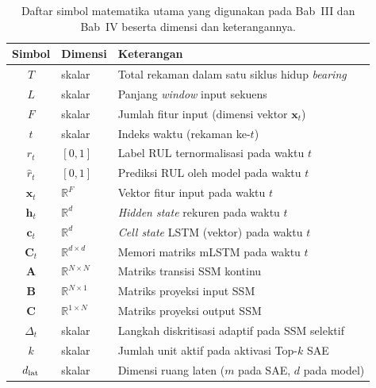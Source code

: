 \begin{table}[ht]
  \centering
  \caption{Daftar simbol matematika utama yang digunakan pada Bab~III
           dan Bab~IV beserta dimensi dan keterangannya.}
  \label{tab:bab3_notasi}
  \small
  \begin{tabular}{@{}cll@{}}
    \toprule
    \textbf{Simbol} & \textbf{Dimensi} & \textbf{Keterangan} \\
    \midrule
    $T$              & skalar          & Total rekaman dalam satu siklus hidup \emph{bearing} \\
    $L$              & skalar          & Panjang \emph{window} input sekuens \\
    $F$              & skalar          & Jumlah fitur input (dimensi vektor $\mathbf{x}_t$) \\
    $t$              & skalar          & Indeks waktu (rekaman ke-$t$) \\
    $r_t$            & $[0,1]$         & Label RUL ternormalisasi pada waktu $t$ \\
    $\hat{r}_t$      & $[0,1]$         & Prediksi RUL oleh model pada waktu $t$ \\
    $\mathbf{x}_t$   & $\mathbb{R}^F$  & Vektor fitur input pada waktu $t$ \\
    $\mathbf{h}_t$   & $\mathbb{R}^d$  & \emph{Hidden state} rekuren pada waktu $t$ \\
    $\mathbf{c}_t$   & $\mathbb{R}^d$  & \emph{Cell state} LSTM (vektor) pada waktu $t$ \\
    $\mathbf{C}_t$   & $\mathbb{R}^{d\times d}$ & Memori matriks mLSTM pada waktu $t$ \\
    $\mathbf{A}$     & $\mathbb{R}^{N\times N}$ & Matriks transisi SSM kontinu \\
    $\mathbf{B}$     & $\mathbb{R}^{N\times 1}$ & Matriks proyeksi input SSM \\
    $\mathbf{C}$     & $\mathbb{R}^{1\times N}$ & Matriks proyeksi output SSM \\
    $\Delta_t$       & skalar          & Langkah diskritisasi adaptif pada SSM selektif \\
    $k$              & skalar          & Jumlah unit aktif pada aktivasi Top-$k$ SAE \\
    $d_{\rm lat}$    & skalar          & Dimensi ruang laten ($m$ pada SAE, $d$ pada model) \\
    \bottomrule
  \end{tabular}
\end{table}

